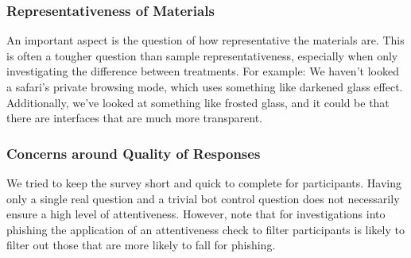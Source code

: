 \documentclass[twoside,letterpaper]{soups}
\begin{document}








\subsubsection{Representativeness of Materials}

An important aspect is the question of how representative the materials are. This is often a tougher question than sample representativeness, especially when only investigating the difference between treatments. For example: We haven't looked a safari's private browsing mode, which uses something like darkened glass effect. Additionally, we've looked at something like frosted glass, and it could be that there are interfaces that are much more transparent.

\subsubsection{Concerns around Quality of Responses}

We tried to keep the survey short and quick to complete for participants. Having only a single real question and a trivial bot control question does not necessarily ensure a high level of attentiveness. However, note that for investigations into phishing the application of an attentiveness check to filter participants is likely to filter out those that are more likely to fall for phishing.
\end{document}
